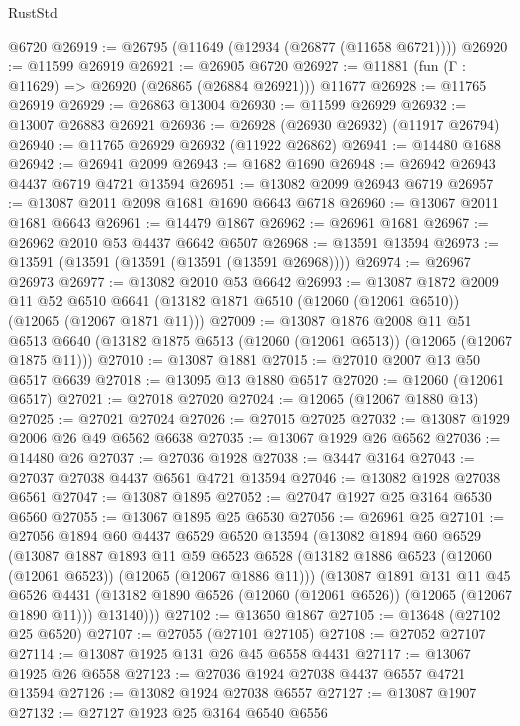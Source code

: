 \begin{lexlean}{RustStd}
\begin{coremodule}
    @6720
@26919 := @26795 (@11649 (@12934 (@26877 (@11658 @6721))))
@26920 := @11599 @26919
@26921 := @26905 @6720
@26927 := @11881 (fun (Γ : @11629) => @26920 (@26865 (@26884 @26921))) @11677
@26928 := @11765 @26919
@26929 := @26863 @13004
@26930 := @11599 @26929
@26932 := @13007 @26883 @26921
@26936 := @26928 (@26930 @26932) (@11917 @26794)
@26940 := @11765 @26929 @26932 (@11922 @26862)
@26941 := @14480 @1688
@26942 := @26941 @2099
@26943 := @1682 @1690
@26948 := @26942 @26943 @4437 @6719 @4721 @13594
@26951 := @13082 @2099 @26943 @6719
@26957 := @13087 @2011 @2098 @1681 @1690 @6643 @6718
@26960 := @13067 @2011 @1681 @6643
@26961 := @14479 @1867
@26962 := @26961 @1681
@26967 := @26962 @2010 @53 @4437 @6642 @6507
@26968 := @13591 @13594
@26973 := @13591 (@13591 (@13591 (@13591 (@13591 @26968))))
@26974 := @26967 @26973
@26977 := @13082 @2010 @53 @6642
@26993 := @13087
    @1872
    @2009
    @11
    @52
    @6510
    @6641
    (@13182 @1871 @6510 (@12060 (@12061 @6510)) (@12065 (@12067 @1871 @11)))
@27009 := @13087
    @1876
    @2008
    @11
    @51
    @6513
    @6640
    (@13182 @1875 @6513 (@12060 (@12061 @6513)) (@12065 (@12067 @1875 @11)))
@27010 := @13087 @1881
@27015 := @27010 @2007 @13 @50 @6517 @6639
@27018 := @13095 @13 @1880 @6517
@27020 := @12060 (@12061 @6517)
@27021 := @27018 @27020
@27024 := @12065 (@12067 @1880 @13)
@27025 := @27021 @27024
@27026 := @27015 @27025
@27032 := @13087 @1929 @2006 @26 @49 @6562 @6638
@27035 := @13067 @1929 @26 @6562
@27036 := @14480 @26
@27037 := @27036 @1928
@27038 := @3447 @3164
@27043 := @27037 @27038 @4437 @6561 @4721 @13594
@27046 := @13082 @1928 @27038 @6561
@27047 := @13087 @1895
@27052 := @27047 @1927 @25 @3164 @6530 @6560
@27055 := @13067 @1895 @25 @6530
@27056 := @26961 @25
@27101 := @27056
    @1894
    @60
    @4437
    @6529
    @6520
    @13594
    (@13082
      @1894
      @60
      @6529
      (@13087
        @1887
        @1893
        @11
        @59
        @6523
        @6528
        (@13182 @1886 @6523 (@12060 (@12061 @6523)) (@12065 (@12067 @1886 @11)))
        (@13087
          @1891
          @131
          @11
          @45
          @6526
          @4431
          (@13182 @1890 @6526 (@12060 (@12061 @6526)) (@12065 (@12067 @1890 @11)))
          @13140)))
@27102 := @13650 @1867
@27105 := @13648 (@27102 @25 @6520)
@27107 := @27055 (@27101 @27105)
@27108 := @27052 @27107
@27114 := @13087 @1925 @131 @26 @45 @6558 @4431
@27117 := @13067 @1925 @26 @6558
@27123 := @27036 @1924 @27038 @4437 @6557 @4721 @13594
@27126 := @13082 @1924 @27038 @6557
@27127 := @13087 @1907
@27132 := @27127 @1923 @25 @3164 @6540 @6556

\end{coremodule}
\end{lexlean}
